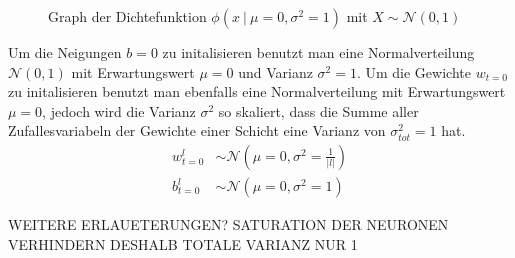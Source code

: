 \begin{figure}[h!]
  \centering
  \caption{Graph der Dichtefunktion $\phi(x\ |\ \mu=0,\sigma^2=1)$ mit $X\sim\mathcal{N}(0,1)$}%
\end{figure}


Um die Neigungen $b=0$ zu initalisieren benutzt man eine Normalverteilung
$\mathcal{N}(0,1)$ mit Erwartungswert $\mu = 0$ und Varianz $\sigma^2 =
1$. Um die Gewichte $w_{t=0}$ zu initalisieren benutzt man ebenfalls eine
Normalverteilung mit Erwartungswert $\mu = 0$, jedoch wird die Varianz
$\sigma^2$ so skaliert, dass die Summe aller Zufallesvariabeln der Gewichte
einer Schicht eine Varianz von $\sigma^2_{tot} = 1$ hat.
\begin{align}
  w_{t=0}^l &\sim \mathcal{N}(\mu = 0, \sigma^2 = \frac{1}{|l|}) \\
  b_{t=0}^l &\sim \mathcal{N}(\mu = 0, \sigma^2 = 1)
\end{align}


WEITERE ERLAUETERUNGEN? SATURATION DER NEURONEN VERHINDERN DESHALB TOTALE VARIANZ
NUR 1

\para{}
\cite{wiki:normal_distribution}
\cite{Nielsen}

